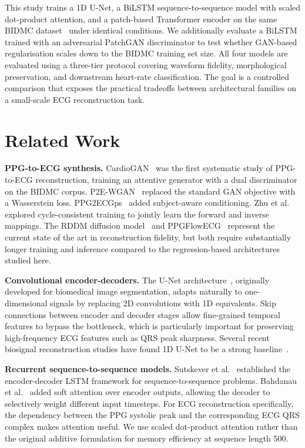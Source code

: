 \documentclass[11pt,a4paper]{article}
\begin{document}
This study trains a 1D U-Net, a BiLSTM sequence-to-sequence model with scaled dot-product attention, and a patch-based Transformer encoder on the same BIDMC dataset~\cite{goldberger2000physionet,pimentel2017bidmc} under identical conditions. We additionally evaluate a BiLSTM trained with an adversarial PatchGAN discriminator to test whether GAN-based regularisation scales down to the BIDMC training set size. All four models are evaluated using a three-tier protocol covering waveform fidelity, morphological preservation, and downstream heart-rate classification. The goal is a controlled comparison that exposes the practical tradeoffs between architectural families on a small-scale ECG reconstruction task.

\section{Related Work}

\textbf{PPG-to-ECG synthesis.} CardioGAN~\cite{sarkar2021cardiogan} was the first systematic study of PPG-to-ECG reconstruction, training an attentive generator with a dual discriminator on the BIDMC corpus. P2E-WGAN~\cite{vo2021p2ewgan} replaced the standard GAN objective with a Wasserstein loss. PPG2ECGps~\cite{tang2022ppg2ecgps} added subject-aware conditioning. Zhu et al.~\cite{zhu2021ecgrec} explored cycle-consistent training to jointly learn the forward and inverse mappings. The RDDM diffusion model~\cite{liu2024rddm} and PPGFlowECG~\cite{chen2025ppgflowecg} represent the current state of the art in reconstruction fidelity, but both require substantially longer training and inference compared to the regression-based architectures studied here.

\textbf{Convolutional encoder-decoders.} The U-Net architecture~\cite{ronneberger2015unet}, originally developed for biomedical image segmentation, adapts naturally to one-dimensional signals by replacing 2D convolutions with 1D equivalents. Skip connections between encoder and decoder stages allow fine-grained temporal features to bypass the bottleneck, which is particularly important for preserving high-frequency ECG features such as QRS peak sharpness. Several recent biosignal reconstruction studies have found 1D U-Net to be a strong baseline~\cite{kim2024unet1d}.

\textbf{Recurrent sequence-to-sequence models.} Sutskever et al.~\cite{sutskever2014seq2seq} established the encoder-decoder LSTM framework for sequence-to-sequence problems. Bahdanau et al.~\cite{bahdanau2015attention} added soft attention over encoder outputs, allowing the decoder to selectively weight different input timesteps. For ECG reconstruction specifically, the dependency between the PPG systolic peak and the corresponding ECG QRS complex makes attention useful. We use scaled dot-product attention rather than the original additive formulation for memory efficiency at sequence length 500.
\end{document}
